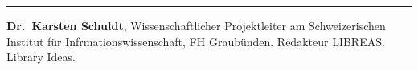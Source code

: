\begin{center}\rule{0.5\linewidth}{0.5pt}\end{center}

\textbf{Dr.~Karsten Schuldt}, Wissenschaftlicher Projektleiter am
Schweizerischen Institut für Infrmationswissenschaft, FH Graubünden.
Redakteur LIBREAS. Library Ideas.
